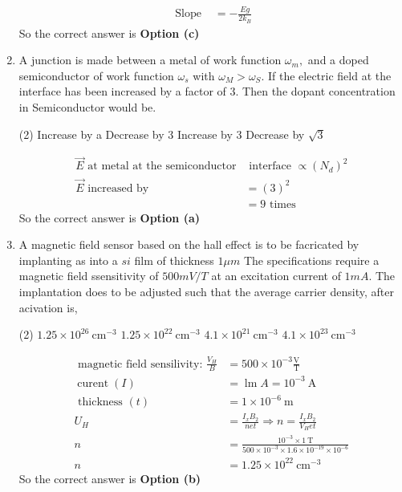 \begin{enumerate}
\begin{answer}
\begin{align*}
	\text { Slope }&=-\frac{E g}{2 k_{B}}
	\end{align*}
	So the correct answer is \textbf{Option (c)}
\end{answer}
\item 
	A junction is made between a metal of work function $\omega_m ,$  and a doped semiconductor of work function $\omega_s$ with $\omega_{M}>\omega_{S} $. If the electric field at the interface has been increased by a factor of $3$. Then the dopant concentration in Semiconductor would be. 
	\begin{tasks}(2)
		\task[\textbf{a.}]Increase by a
		\task[\textbf{b.}]Decrease by 3
		\task[\textbf{c.}]Increase by 3
		\task[\textbf{d.}]Decrease by $\sqrt{3}$
	\end{tasks}
\begin{answer}
	\begin{align*}
	\vec{E} \text { at metal at the semiconductor} &\text { interface } \propto\left(N_{d}\right)^{2}\\
	\vec{E} \text { increased by } &=(3)^{2} \\
	&=9 \text { times }
	\end{align*}
	So the correct answer is \textbf{Option (a)}
\end{answer}
\item 
	A magnetic field sensor based on the hall effect is to be facricated by implanting as into a $si$ film of thickness $1\mu m$
	The specifications require a magnetic field ssensitivity of $500 mV/T$ at an excitation current of $1 mA$. The implantation does to be adjusted such that the average carrier density, after acivation is,
	\begin{tasks}(2)
		\task[\textbf{a.}] $1.25 \times 10^{26} \mathrm{~cm}^{-3}$
		\task[\textbf{b.}]$1.25 \times 10^{22} \mathrm{~cm}^{-3}$
		\task[\textbf{c.}]$4.1 \times 10^{21} \mathrm{~cm}^{-3}$
		\task[\textbf{d.}] $4.1 \times 10^{23} \mathrm{~cm}^{-3}$
	\end{tasks}
\begin{answer}
	\begin{align*}\text { magnetic field sensilivity: } \frac{V_{H}}{B}&=500 \times 10^{-3} \frac{\mathrm{V}}{\mathrm{T}}\\
	\operatorname{curent}(I)&=\operatorname{lm} A=10^{-3} \mathrm{~A}\\
	\text { thickness }(t)&=1 \times 10^{-6} \mathrm{~m}\\
	U_{H}&=\frac{I_{x} B_{2}}{n e t} \Rightarrow n=\frac{I_{x} B_{2}}{V_{H} e t}\\
	n&=\frac{10^{-3} \times 1 \mathrm{~T}}{500 \times 10^{-3} \times 1.6 \times 10^{-19} \times 10^{-6}} \\
	n&=1.25 \times 10^{22} \mathrm{~cm}^{-3}
	\end{align*}
	So the correct answer is \textbf{Option (b)}
\end{answer}
\end{enumerate}